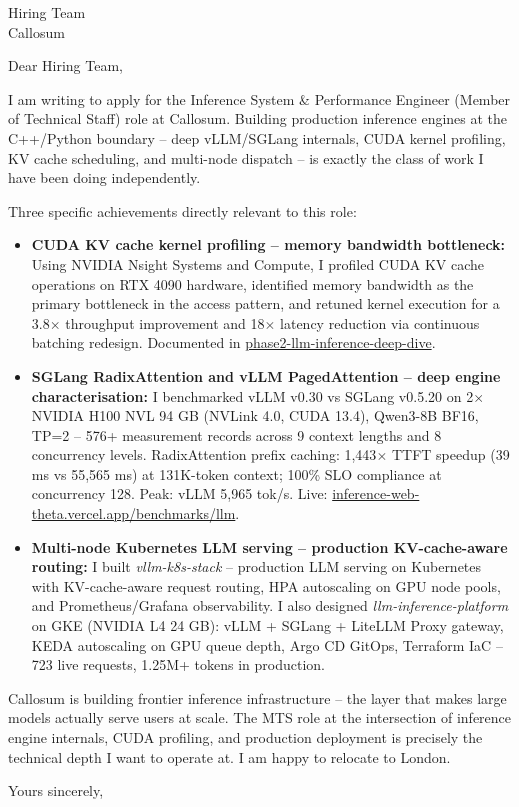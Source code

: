 \documentclass[a4paper]{letter}
\date{\today}
\begin{document}
\begin{letter}{Hiring Team \\ Callosum}

\opening{Dear Hiring Team,}

I am writing to apply for the Inference System \& Performance Engineer (Member of Technical Staff) role at Callosum. Building production inference engines at the C++/Python boundary -- deep vLLM/SGLang internals, CUDA kernel profiling, KV cache scheduling, and multi-node dispatch -- is exactly the class of work I have been doing independently.

Three specific achievements directly relevant to this role:

\begin{itemize}
  \item \textbf{CUDA KV cache kernel profiling -- memory bandwidth bottleneck:} Using NVIDIA Nsight Systems and Compute, I profiled CUDA KV cache operations on RTX 4090 hardware, identified memory bandwidth as the primary bottleneck in the access pattern, and retuned kernel execution for a 3.8$\times$ throughput improvement and 18$\times$ latency reduction via continuous batching redesign. Documented in \href{https://github.com/AyeniOluwatosinOlawale/phase2-llm-inference-deep-dive}{phase2-llm-inference-deep-dive}.

  \item \textbf{SGLang RadixAttention and vLLM PagedAttention -- deep engine characterisation:} I benchmarked vLLM v0.30 vs SGLang v0.5.20 on 2$\times$ NVIDIA H100 NVL 94 GB (NVLink 4.0, CUDA 13.4), Qwen3-8B BF16, TP=2 -- 576+ measurement records across 9 context lengths and 8 concurrency levels. RadixAttention prefix caching: 1,443$\times$ TTFT speedup (39 ms vs 55,565 ms) at 131K-token context; 100\% SLO compliance at concurrency 128. Peak: vLLM 5,965 tok/s. Live: \href{https://inference-web-theta.vercel.app/benchmarks/llm}{inference-web-theta.vercel.app/benchmarks/llm}.

  \item \textbf{Multi-node Kubernetes LLM serving -- production KV-cache-aware routing:} I built \textit{vllm-k8s-stack} -- production LLM serving on Kubernetes with KV-cache-aware request routing, HPA autoscaling on GPU node pools, and Prometheus/Grafana observability. I also designed \textit{llm-inference-platform} on GKE (NVIDIA L4 24 GB): vLLM + SGLang + LiteLLM Proxy gateway, KEDA autoscaling on GPU queue depth, Argo CD GitOps, Terraform IaC -- 723 live requests, 1.25M+ tokens in production.
\end{itemize}

Callosum is building frontier inference infrastructure -- the layer that makes large models actually serve users at scale. The MTS role at the intersection of inference engine internals, CUDA profiling, and production deployment is precisely the technical depth I want to operate at. I am happy to relocate to London.

\closing{Yours sincerely,}

\end{letter}
\end{document}
